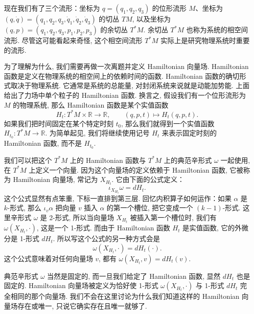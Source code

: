 现在我们有了三个流形：坐标为 $q=(q_1,q_2,q_3)$ 的位形流形 $M$、坐标为 $(q,\dot{q})=(q_1,q_2,q_3,\dot{q}_1,\dot{q}_2,\dot{q}_3)$ 的切丛 $TM$, 以及坐标为 $(q,p)=(q_1,q_2,q_3,p_1,p_2,p_3)$ 的余切丛 $T^*M$. 余切丛 $T^*M$ 也称为系统的相空间流形. 尽管这可能看起来奇怪, 这个相空间流形 $T^*M$ 实际上是研究物理系统时重要的流形.

为了理解为什么, 我们需要再做一次离题并定义 Hamiltonian 向量场. Hamiltonian 函数是定义在物理系统的相空间上的依赖时间的函数. Hamiltonian 函数的确切形式取决于物理系统. 它通常是系统的总能量, 对封闭系统来说就是动能加势能. 上面给出了力场中单个粒子的 Hamiltonian 函数. 换言之, 假设我们有一个位形流形为 $M$ 的物理系统, 那么 Hamiltonian 函数是某个实值函数
\[
H_t:T^*M\times\mathbb{R}\longrightarrow\mathbb{R},\qquad(q,p,t)\longmapsto H_t(q,p,t).
\]
如果我们把时间固定在某个特定时刻 $t_0$, 那么我们就得到一个实值函数 $H_{t_0}:T^*M\to\mathbb{R}$. 为简单起见, 我们将继续使用记号 $H_t$ 来表示固定时刻的 Hamiltonian 函数, 而不是 $H_{t_0}$.

我们可以把这个 $T^*M$ 上的 Hamiltonian 函数与 $T^*M$ 上的典范辛形式 $\omega$ 一起使用, 在 $T^*M$ 上定义一个向量. 因为这个向量场的定义依赖于 Hamiltonian 函数, 它被称为 Hamiltonian 向量场, 常记为 $X_{H_t}$. 它由下面的公式定义：
\[
\iota_{X_{H_t}}\omega=dH_t.
\]
这个公式显然有点笨重, 下标一直排到第三层. 回忆内积算子如何运作：如果 $\alpha$ 是 $k$-形式, 那么 $\iota_v\alpha$ 把向量 $v$ 插入 $\alpha$ 的第一个槽位, 把它变成一个 $(k-1)$-形式. 这里辛形式 $\omega$ 是 2-形式, 所以当向量场 $X_{H_t}$ 被插入第一个槽位时, 我们有 $\omega(X_{H_t},\cdot)$, 这是一个 1-形式. 而由于 Hamiltonian 函数 $H_t$ 是实值函数, 它的外微分是 1-形式 $dH_t$. 所以写这个公式的另一种方式会是
\[
\omega(X_{H_t},\cdot)=dH_t(\cdot).
\]
这个公式意味着对任何向量场 $v$, 都有 $\omega(X_{H_t},v)=dH_t(v)$.

典范辛形式 $\omega$ 当然是固定的, 而一旦我们给定了 Hamiltonian 函数, 显然 $dH_t$ 也是固定的. Hamiltonian 向量场被定义为恰好使 1-形式 $\omega(X_{H_t},\cdot)$ 与 1-形式 $dH_t$ 完全相同的那个向量场. 我们不会在这里讨论为什么我们知道这样的 Hamiltonian 向量场存在或唯一, 只说它确实存在且唯一就够了.

